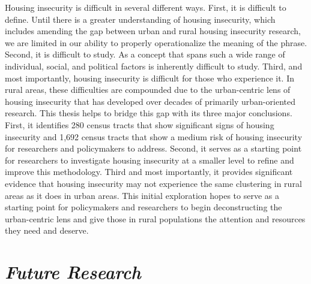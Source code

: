 Housing insecurity is difficult in several different ways. First, it is difficult to define. Until there is a greater understanding of housing insecurity, which includes amending the gap between urban and rural housing insecurity research, we are limited in our ability to properly operationalize the meaning of the phrase. Second, it is difficult to study. As a concept that spans such a wide range of individual, social, and political factors is inherently difficult to study. Third, and most importantly, housing insecurity is difficult for those who experience it. In rural areas, these difficulties are compounded due to the urban-centric lens of housing insecurity that has developed over decades of primarily urban-oriented research. This thesis helps to bridge this gap with its three major conclusions. First, it identifies 280 census tracts that show significant signs of housing insecurity and 1,692 census tracts that show a medium risk of housing insecurity for researchers and policymakers to address. Second, it serves as a starting point for researchers to investigate housing insecurity at a smaller level to refine and improve this methodology. Third and most importantly, it provides significant evidence that housing insecurity may not experience the same clustering in rural areas as it does in urban areas. This initial exploration hopes to serve as a starting point for policymakers and researchers to begin deconstructing the urban-centric lens and give those in rural populations the attention and resources they need and deserve. 

\section{\textit{Future Research}}


